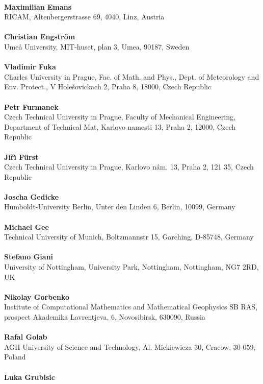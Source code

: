 \\ 
\textbf{Maximilian Emans}
\\ 
RICAM, Altenbergerstrasse 69, 4040, Linz, Austria\\ 
\\ 
\textbf{Christian Engstr\"om}
\\ 
Ume\r{a} University, MIT-huset, plan 3, Umea, 90187, Sweden\\ 
\\ 
\textbf{Vladimir Fuka}
\\ 
Charles University in Prague, Fac. of Math. and Phys., Dept. of Meteorology and Env. Protect., V Holešovickach 2, Praha 8, 18000, Czech Republic\\ 
\\ 
\textbf{Petr Furmanek}
\\ 
Czech Technical University in Prague, Faculty of Mechanical Engineering, Department of Technical Mat, Karlovo namesti 13, Praha 2, 12000, Czech Republic\\ 
\\ 
\textbf{Ji\v{r}\'{\i} F\"urst}
\\ 
Czech Technical University in Prague, Karlovo n\'am. 13, Praha 2, 121 35, Czech Republic\\ 
\\ 
\textbf{Joscha Gedicke}
\\ 
Humboldt-University Berlin, Unter den Linden 6, Berlin, 10099, Germany\\ 
\\ 
\textbf{Michael Gee}
\\ 
Technical University of Munich, Boltzmannstr 15, Garching, D-85748, Germany\\ 
\\ 
\textbf{Stefano Giani}
\\ 
University of Nottingham, University Park, Nottingham, Nottingham, NG7 2RD, UK\\ 
\\ 
\textbf{Nikolay Gorbenko}
\\ 
Institute of Computational Mathematics and Mathematical Geophysics SB RAS, prospect Akademika Lavrentjeva, 6, Novosibirsk, 630090, Russia\\ 
\\ 
\textbf{Rafal Golab}
\\ 
AGH University of Science and Technology, Al. Mickiewicza 30, Cracow, 30-059, Poland\\ 
\\ 
\textbf{Luka Grubisic}
\\ 
